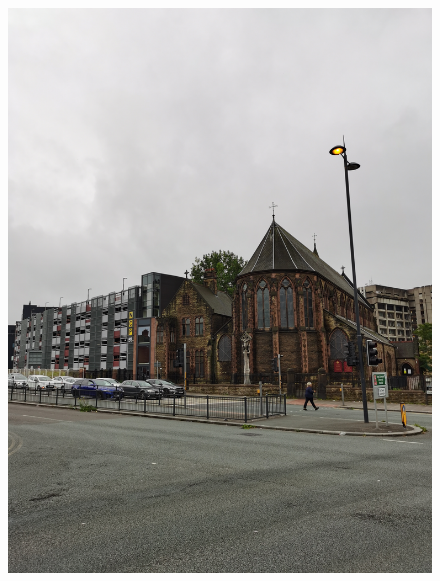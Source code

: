 \documentclass[11pt]{article}
\begin{document}
\begin{figure}[H]
    \centering
    \includegraphics[width=\textwidth]{1C.jpg}
\end{figure}
\end{document}

